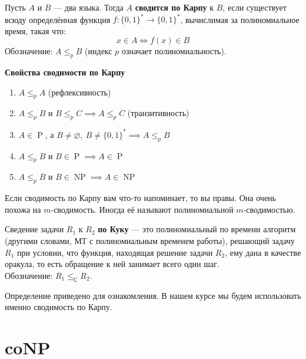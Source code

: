 \documentclass[11pt]{article}
\DeclareMathOperator{\Poly}{P}
\DeclareMathOperator{\NP}{NP}
\begin{document}
\begin{definition}
  Пусть $A$ и $B$ --- два языка. Тогда $A$ \textbf{сводится по Карпу} к $B$, если существует всюду определённая функция $f \colon \{0, 1\}^{*} \to \{0, 1\}^{*}$, вычислимая 
  за полиномиальное время, такая что: 
  \[x \in A \Longleftrightarrow f(x) \in B\]
  Обозначение: $A \leq_{p} B$ (индекс $p$ означает полиномиальность).
\end{definition}

\begin{lemma}
  \textbf{Свойства сводимости по Карпу}
  \begin{enumerate}
    \item $A \leq_{p} A$ (рефлексивность)
    \item $A \leq_{p} B$ и $B \leq_{p} C \implies A \leq_{p} C$ (транзитивность)
    \item $A \in \Poly$, а $B \neq \varnothing, \ B \neq \{0, 1\}^{*} \implies A \leq_{p} B$
    \item $A \leq_{p} B$ и $B \in \Poly \implies A \in \Poly$
    \item $A \leq_{p} B$ и $B \in \NP \implies A \in \NP$
  \end{enumerate}
\end{lemma}

\begin{remark}
  Если сводимость по Карпу вам что-то напоминает, то вы правы. Она очень похожа на $m$-сводимость. Иногда её называют полиномиальной $m$-сводимостью.
\end{remark}

\begin{definition}
  Сведение задачи $R_1$ к $R_2$ \textbf{по Куку} --- это полиномиальный по времени алгоритм (другими словами, МТ с полиномиальным временем работы), решающий задачу $R_1$ при условии, что 
  функция, находящая решение задачи $R_2$, ему дана в качестве оракула, то есть обращение к ней занимает всего один шаг. \\
  Обозначение: $R_1 \leq_{С} R_2$. 
\end{definition}

\begin{remark}
  Определение приведено для ознакомления. В нашем курсе мы будем использовать именно сводимость по Карпу.
\end{remark}

\section{coNP}
\end{document}
